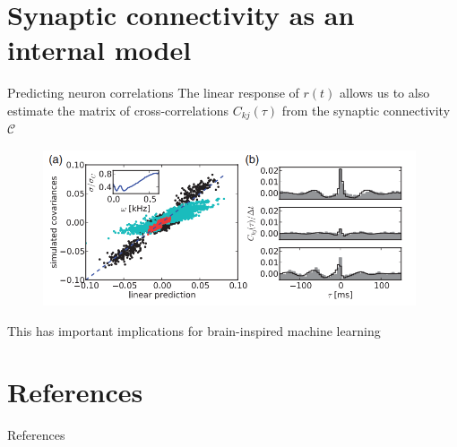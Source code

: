 \documentclass{beamer}					%
\begin{document}
\section{Synaptic connectivity as an internal model}
\begin{frame}{Predicting neuron correlations}
The linear response of $r(t)$ allows us to also estimate the matrix of cross-correlations $C_{kj}(\tau)$
from the synaptic connectivity $\mathcal{C}$
\begin{figure}
\centering
\includegraphics[width=110mm]{figure-20}
\end{figure}

This has important implications for brain-inspired machine learning

\end{frame}


\section{References}

\begin{frame}[allowframebreaks]{References}
	\tiny
	
\end{frame}
\end{document}
